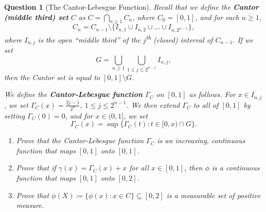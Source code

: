 \documentclass[notoc,notitlepage]{tufte-book}
\newtheorem{assgprob}{Question}[section]
\begin{document}
\begin{assgprob}[The Cantor-Lebesgue Function]
  Recall that we define the \textbf{Cantor (middle third) set} $C$
  as $C = \bigcap_{n \geq 1} C_n$, where $C_0 = [0, 1]$,
  and for each $n \geq 1$,
  \begin{equation*}
    C_n = C_{n-1} \setminus \{
      I_{n,1} \cup I_{n, 2} \cup \hdots \cup I_{n, 2^{n-1}}
    \},
  \end{equation*}
  where $I_{n, j}$ is the open ``middle third''
  of the $j$\textsuperscript{th} (closed) interval of $C_{n-1}$.
  If we set
  \begin{equation*}
    G = \bigcup_{n \geq 1} \bigcup_{1 \leq j \leq 2^{n-1}} I_{n, j} ,
  \end{equation*}
  then the Cantor set is equal to $[0, 1] \setminus G$.

  We define the \textbf{Cantor-Lebesgue function} $\Gamma_C$ on $[0, 1]$
  as follows.
  For $x \in I_{n, j}$, we set $\Gamma_C(x) = \frac{2j  - 1}{2^n}$,
  $1 \leq j \leq 2^{n-1}$.
  We then extend $\Gamma_C$ to all of $[0, 1]$
  by setting $\Gamma_C(0) = 0$, and for $x \in (0, 1]$, we set
  \begin{equation*}
    \Gamma_C(x) = \sup \{ \Gamma_C(t) : t \in [0, x) \cap G \}.
  \end{equation*}

  \begin{enumerate}
    \item Prove that the Cantor-Lebesgue function $\Gamma_C$
      is an increasing, continuous function that maps
      $[0, 1]$ onto $[0, 1]$.
    \item Prove that if $\gamma(x) = \Gamma_C(x) + x$ for all $x \in [0, 1]$,
      then $\phi$ is a continuous function that maps $[0, 1]$
      onto $[0, 2]$.
    \item Prove that $\phi(X) \coloneqq \{ \phi(x) : x \in C \} \subseteq [0, 2]$
      is a measurable set of positive measure.
  \end{enumerate}
\end{assgprob}
\end{document}

